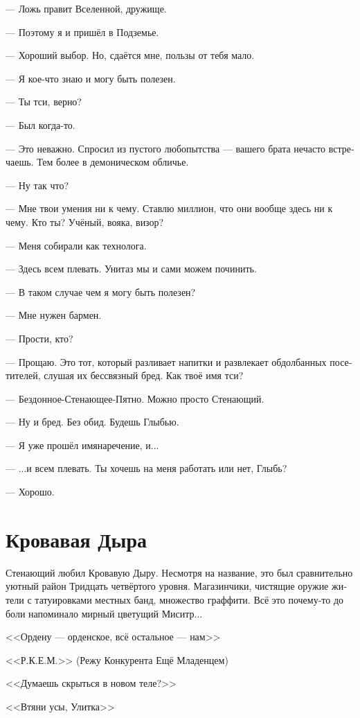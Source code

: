 \documentclass[a4paper,12pt,fleqn]{book}\usepackage{cooltooltips}\usepackage{polyglossia}\setdefaultlanguage[babelshorthands=true]{russian}\setotherlanguage{english}\defaultfontfeatures{Ligatures=TeX,Mapping=tex-text} \usepackage{xcolor}\definecolor{lightgray}{HTML}{bbbbbb}\color{lightgray}\newcommand{\ml}[3]{\textenglish{\textcolor{black}{#3}}}
\begin{document}
--- Ложь правит Вселенной, дружище.

--- Поэтому я и пришёл в Подземье.

--- Хороший выбор.
Но, сдаётся мне, пользы от тебя мало.

--- Я кое-что знаю и могу быть полезен.

--- Ты тси, верно?

--- Был когда-то.

--- Это неважно.
Спросил из пустого любопытства --- вашего брата нечасто встречаешь.
Тем более в демоническом обличье.

--- Ну так что?

--- Мне твои умения ни к чему.
Ставлю миллион, что они вообще здесь ни к чему.
Кто ты?
Учёный, вояка, визор?

--- Меня собирали как технолога.

--- Здесь всем плевать.
Унитаз мы и сами можем починить.

--- В таком случае чем я могу быть полезен?

--- Мне нужен бармен.

--- Прости, кто?

--- Прощаю.
Это тот, который разливает напитки и развлекает обдолбанных посетителей, слушая их бессвязный бред.
Как твоё имя тси?

--- Бездонное-Стенающее-Пятно.
Можно просто Стенающий. %

--- Ну и бред.
Без обид.
Будешь Глыбью. %

--- Я уже прошёл имянаречение, и...

--- ...и всем плевать.
Ты хочешь на меня работать или нет, Глыбь?

--- Хорошо.

\section{Кровавая Дыра}

Стенающий любил Кровавую Дыру.
Несмотря на название, это был сравнительно уютный район Тридцать четвёртого уровня.
Магазинчики, чистящие оружие жители с татуировками местных банд, множество граффити.
Всё это почему-то до боли напоминало мирный цветущий Миситр...

<<Ордену --- орденское, всё остальное --- нам>>

<<Р.К.Е.М.>> (Режу Конкурента Ещё Младенцем)

<<Думаешь скрыться в новом теле?>>

<<Втяни усы, Улитка>>
\end{document}
